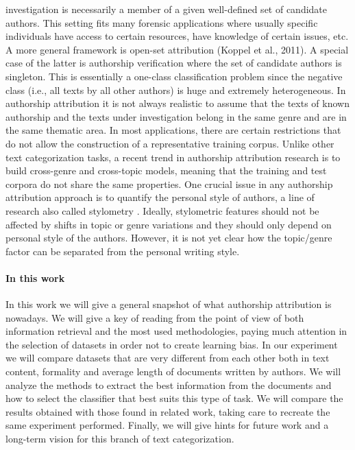 investigation is necessarily a member of a given
well-defined set of candidate authors. This setting fits many forensic applications where usually specific individuals have access to certain resources, have knowledge of certain issues, etc.
A more general
framework is open-set attribution (Koppel et al.,
2011). A special case of the latter is authorship
verification where the set of candidate authors is
singleton. This is essentially a
one-class classification problem since the negative
class (i.e., all texts by all other authors) is huge
and extremely heterogeneous.
In authorship attribution it is not always realistic to assume that the texts of known authorship and the texts under investigation belong in
the same genre and are in the same thematic area.
In most applications, there are certain restrictions
that do not allow the construction of a representative training corpus. Unlike other text categorization tasks, a recent trend in authorship attribution research is to build cross-genre and cross-topic models, meaning that the training and test
corpora do not share the same properties.
One crucial issue in any authorship attribution approach is to quantify the personal style of authors, a line of research also called stylometry \cite{stamatatos2009survey}. Ideally, stylometric features should not be affected by shifts in topic or
genre variations and they should only depend on
personal style of the authors. However, it is not
yet clear how the topic/genre factor can be separated from the personal writing style.

\paragraph{In this work} In this work we will give a general snapshot of what authorship attribution is nowadays. We will give a key of reading from the point of view of both information retrieval and the most used methodologies, paying much attention in the selection of datasets in order not to create learning bias.
In our experiment we will compare datasets that are very different from each other both in text content, formality and average length of documents written by authors.
We will analyze the methods to extract the best information from the documents and how to select the classifier that best suits this type of task.
We will compare the results obtained with those found in related work, taking care to recreate the same experiment performed.
Finally, we will give hints for future work and a long-term vision for this branch of text categorization.

